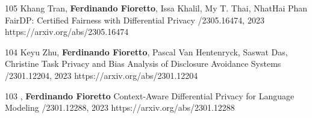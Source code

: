 \begin{pubs}
\wsentry
	{105}
	{Khang Tran, {\bf Ferdinando Fioretto}, Issa Khalil, My T. Thai, NhatHai Phan} 
	{FairDP: Certified Fairness with Differential Privacy}
	{/2305.16474, 2023}
	{https://arxiv.org/abs/2305.16474}

\wsentry 
	{104}%
	{Keyu Zhu, {\bf Ferdinando Fioretto}, Pascal Van Hentenryck, Saswat Das, Christine Task}
	{Privacy and Bias Analysis of Disclosure Avoidance Systems}
	{/2301.12204, 2023}
	{https://arxiv.org/abs/2301.12204}

\wsentry 
	{103}%
	{, {\bf Ferdinando Fioretto}}
	{Context-Aware Differential Privacy for Language Modeling}
	{/2301.12288, 2023}
	{https://arxiv.org/abs/2301.12288}




\end{pubs}
